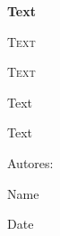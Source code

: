 \begin{titlepage}
    \centering
    \vspace{1cm}
    {\bfseries\LARGE Text\par}
    \vspace{0.5cm}
    {\scshape\Large Text\par}
    \vspace{2cm}
    {\scshape\Huge Text\par}
    \vspace{2cm}
    {\Huge Text\par}
    {\Large Text\par}
    \vfill
    {\Large Autores: \par}
    {\Large Name\par}
    \vfill
    {\Large Date\par}
\end{titlepage}
